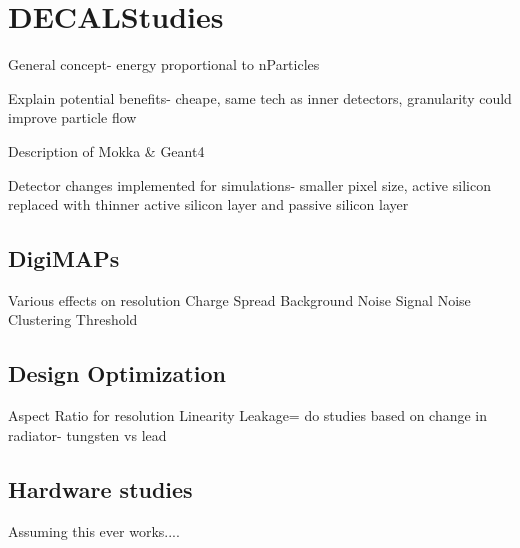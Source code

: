 \chapter{DECALStudies}

General concept- energy proportional to nParticles

Explain potential benefits- cheape, same tech as inner detectors, granularity could improve particle flow


Description of Mokka \& Geant4

Detector changes implemented for simulations- smaller pixel size, active silicon replaced with thinner active silicon layer and passive silicon layer
 

\section{DigiMAPs}
Various effects on resolution
Charge Spread
Background Noise
Signal Noise
Clustering
Threshold

\section{Design Optimization}
Aspect Ratio for resolution
Linearity
Leakage= do studies based on change in radiator- tungsten vs lead


\section{Hardware studies}
Assuming this ever works....
